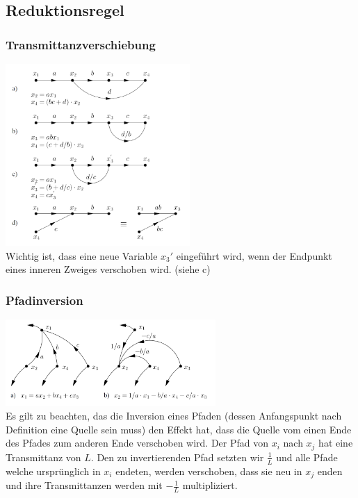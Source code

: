 \subsection{Reduktionsregel }
  \begin{multicols}{2}
    \subsubsection{Transmittanzverschiebung}
      \includegraphics[width=7cm]{./images/transmittanzverschiebung.png} \\
      Wichtig ist, dass eine neue Variable $x_3'$ eingeführt wird, wenn der Endpunkt eines
      inneren Zweiges verschoben wird. \newline (siehe c)
      \vfill
  \columnbreak
  
    \subsubsection{Pfadinversion}
      \includegraphics[width=8cm]{./images/pfadinversion.png} \\
      Es gilt zu beachten, das die Inversion eines Pfaden (dessen Anfangspunkt nach Definition
      eine Quelle sein muss) den Effekt hat, dass die Quelle vom einen Ende des Pfades zum anderen
      Ende verschoben wird. Der Pfad von $x_i$ nach $x_j$ hat eine Transmittanz von $L$. 
      Den zu invertierenden Pfad setzten wir $\frac{1}{L}$ und alle Pfade welche ursprünglich in
      $x_i$ endeten, werden verschoben, dass sie neu in $x_j$ enden und ihre Transmittanzen werden
      mit $-\frac{1}{L}$ multipliziert.
      

\end{multicols}
